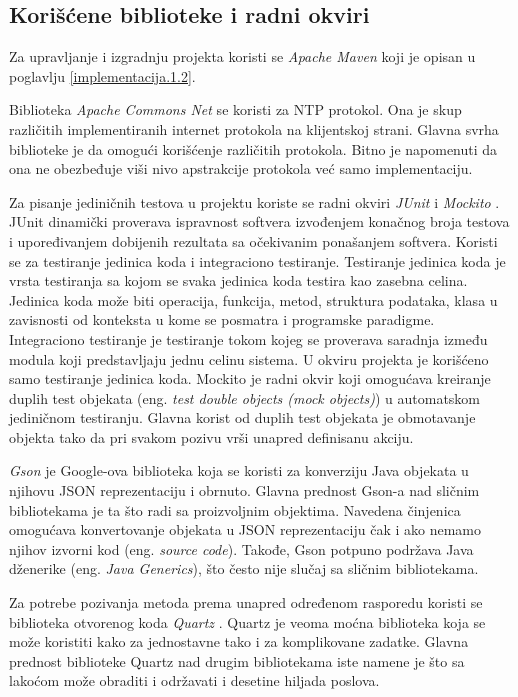 \documentclass[12pt,oneside]{memoir}
\begin{document}
\subsection{Korišćene biblioteke i radni okviri}
\label{implementacija.2.1}

Za upravljanje i izgradnju projekta koristi se \textit{Apache Maven} \cite{Maven} koji je opisan u poglavlju \ref{implementacija.1.2}. 

Biblioteka \textit{Apache Commons Net} \cite{CommonsNet} se koristi za NTP protokol. Ona je skup različitih implementiranih internet protokola na klijentskoj strani. Glavna svrha biblioteke je da omogući korišćenje različitih protokola. Bitno je napomenuti da ona ne obezbeđuje viši nivo apstrakcije protokola već samo implementaciju.  

Za pisanje jediničnih testova u projektu koriste se radni okviri \textit{JUnit} \cite{Junit} i \textit{Mockito} \cite{Mockito}. JUnit dinamički proverava ispravnost softvera izvođenjem konačnog broja testova i upoređivanjem dobijenih rezultata sa očekivanim ponašanjem softvera. Koristi se za testiranje jedinica koda i integraciono testiranje. Testiranje jedinica koda je vrsta testiranja sa kojom se svaka jedinica koda testira kao zasebna celina. Jedinica koda može biti operacija, funkcija, metod, struktura podataka, klasa u zavisnosti od konteksta u kome se posmatra i programske paradigme. Integraciono testiranje je testiranje tokom kojeg se proverava saradnja između modula koji predstavljaju jednu celinu sistema. U okviru projekta je korišćeno samo testiranje jedinica koda. Mockito \cite{Mockito} je radni okvir koji omogućava kreiranje duplih test objekata (eng. \textit{test double objects (mock objects)}) u automatskom jediničnom testiranju. Glavna korist od duplih test objekata je obmotavanje objekta tako da pri svakom pozivu vrši unapred definisanu akciju.

\textit{Gson} \cite{Gson} je Google-ova biblioteka koja se koristi za konverziju Java objekata u njihovu JSON reprezentaciju i obrnuto. Glavna prednost Gson-a nad sličnim bibliotekama je ta što radi sa proizvoljnim objektima. Navedena činjenica omogućava konvertovanje objekata u JSON reprezentaciju čak i ako nemamo njihov izvorni kod (eng. \textit{source code}). Takođe, Gson potpuno podržava Java dženerike (eng. \textit{Java Generics}), što često nije slučaj sa sličnim bibliotekama.

Za potrebe pozivanja metoda prema unapred određenom rasporedu koristi se biblioteka otvorenog koda \textit{Quartz} \cite{Quartz}. Quartz je veoma moćna biblioteka koja se može koristiti kako za jednostavne tako i za komplikovane zadatke. Glavna prednost biblioteke Quartz nad drugim bibliotekama iste namene je što sa lakoćom može obraditi i održavati i desetine hiljada poslova. 
\end{document}
